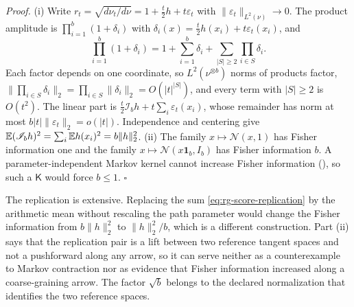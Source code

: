 \noindent\emph{Proof.}
(i) Write \(r_t=\sqrt{d\nu_t/d\nu}=1+\tfrac t2h+t\varepsilon_t\) with
\(\lVert\varepsilon_t\rVert_{L^2(\nu)}\to0\). The product amplitude is
\(\prod_{i=1}^b(1+\delta_i)\) with
\(\delta_i(x)=\tfrac t2h(x_i)+t\varepsilon_t(x_i)\), and
\begin{equation}
\prod_{i=1}^b(1+\delta_i)
=1+\sum_{i=1}^b\delta_i
+\sum_{\lvert S\rvert\geq2}\prod_{i\in S}\delta_i .
\label{eq:rg-product-amplitude-expansion}
\end{equation}
Each factor depends on one coordinate, so \(L^2(\nu^{\otimes b})\) norms of products
factor, \(\lVert\prod_{i\in S}\delta_i\rVert_2=\prod_{i\in S}\lVert\delta_i\rVert_2
=O(\lvert t\rvert^{\lvert S\rvert})\), and every term with \(\lvert S\rvert\geq2\) is
\(O(t^2)\). The linear part is \(\tfrac t2\mathscr I_bh+t\sum_i\varepsilon_t(x_i)\),
whose remainder has norm at most \(b\lvert t\rvert\lVert\varepsilon_t\rVert_2
=o(\lvert t\rvert)\). Independence and centering give
\(\mathbb E(\mathscr I_bh)^2=\sum_i\mathbb E h(x_i)^2=b\lVert h\rVert_2^2\).
(ii) The family \(x\mapsto\mathcal N(x,1)\) has Fisher information one and the family
\(x\mapsto\mathcal N(x\mathbf 1_b,I_b)\) has Fisher information \(b\). A
parameter-independent Markov kernel cannot increase Fisher information
(), so such a \(\mathsf K\) would force \(b\leq1\).
\hfill$\square$

\medskip
The replication is extensive. Replacing the sum \eqref{eq:rg-score-replication} by the
arithmetic mean without rescaling the path parameter would change the Fisher
information from \(b\lVert h\rVert_2^2\) to \(\lVert h\rVert_2^2/b\), which is a different
construction. Part (ii) says that the replication pair is a lift between two
reference tangent spaces and not a pushforward along any arrow, so it can serve
neither as a counterexample to Markov contraction nor as evidence that Fisher
information increased along a coarse-graining arrow. The factor \(\sqrt b\) belongs to
the declared normalization that identifies the two reference spaces.

